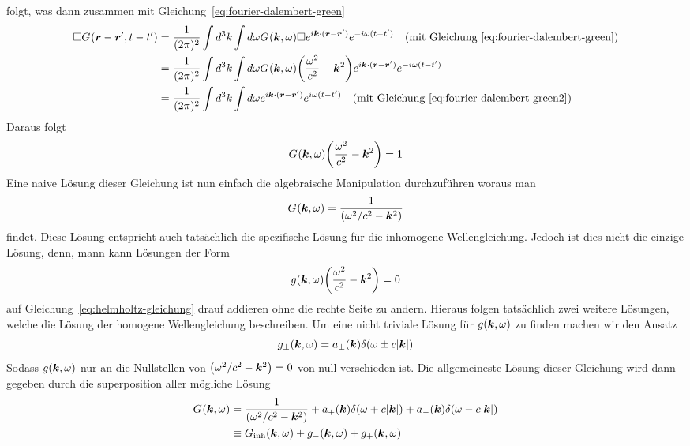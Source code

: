 folgt, was dann zusammen mit Gleichung~\ref{eq:fourier-dalembert-green}
\begin{equation}
  \begin{split}
    \Box G_{}(\vb*r-\vb*r',t-t') 
    &= 
    \frac{1}{(2\pi)^2} \int d^3k\int d\omega G_{}(\vb*k,\omega)\Box 
    e^{i\vb*k\cdot(\vb*r-\vb*r')}
    e^{-i\omega(t-t')}
    \quad(\text{mit Gleichung~\ref{eq:fourier-dalembert-green}})\\
    &=
    \frac{1}{(2\pi)^2} \int d^3k\int d\omega G_{}(\vb*k,\omega)
    \qty(\frac{\omega^2}{c^2}-\vb*k^2)
    e^{i\vb*k\cdot(\vb*r-\vb*r')}
    e^{-i\omega(t-t')}\\
    &=
    \frac{1}{(2\pi)^2} 
    \int d^3k \int d\omega e^{i\vb*k\cdot(\vb*r-\vb*r')}
    e^{i\omega(t-t')}
    \quad(\text{mit Gleichung~\ref{eq:fourier-dalembert-green2}})
  \end{split}
\end{equation}
Daraus folgt
\begin{equation}
  \label{eq:helmholtz-gleichung}
  G_{}(\vb*k,\omega) \qty(\frac{\omega^2}{c^2}-\vb*k^2) = 1
\end{equation}
Eine naive Lösung dieser Gleichung ist nun einfach die algebraische Manipulation durchzuführen woraus man
\begin{equation}
  G_{}(\vb*k,\omega) = \frac{1}{\qty(\omega^2/c^2-\vb*k^2)} 
\end{equation}
findet. Diese Lösung entspricht auch tatsächlich die spezifische Lösung für die inhomogene Wellengleichung. Jedoch ist dies nicht die einzige Lösung, denn, mann kann Lösungen der Form
\begin{equation}
  g(\vb*k, \omega)\qty(\frac{\omega^2}{c^2} -\vb*k^2)=0
\end{equation}
auf Gleichung~\ref{eq:helmholtz-gleichung} drauf addieren ohne die rechte Seite zu andern. Hieraus folgen tatsächlich zwei weitere Lösungen, welche die Lösung der homogene Wellengleichung beschreiben. Um eine nicht triviale Lösung für 
$g(\vb*k,\omega)$ zu finden machen wir den Ansatz
\begin{equation}
  g_{\pm}(\vb*k, \omega)=a_\pm(\vb*k)\delta(\omega\pm c\abs{\vb*k})
\end{equation}
Sodass $g(\vb*k, \omega)$ nur an die Nullstellen von $\qty(\omega^2/c^2-\vb*k^2)=0$ von null verschieden ist.
Die allgemeineste Lösung dieser Gleichung wird dann gegeben durch die
superposition aller mögliche Lösung
\begin{equation}
  \begin{split}
  G_{}(\vb*k,\omega) 
  &= \frac{1}{\qty(\omega^2/c^2-\vb*k^2)} 
  + a_+(\vb*k)\delta(\omega+c\abs{\vb*k})
  + a_-(\vb*k)\delta(\omega-c\abs{\vb*k})\\
  &\equiv
  G_\text{inh}(\vb*k, \omega) + g_-(\vb*k, \omega) + g_+(\vb*k, \omega)
  \end{split}
\end{equation}


